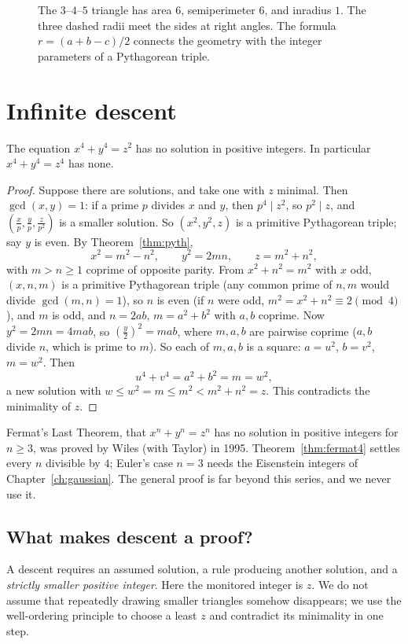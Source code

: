 \begin{figure}[ht]
\centering
{}
\caption{The $3$--$4$--$5$ triangle has area $6$, semiperimeter $6$, and inradius $1$. The three dashed radii meet the sides at right angles. The formula $r=(a+b-c)/2$ connects the geometry with the integer parameters of a Pythagorean triple.}
\label{fig:incircle}
\end{figure}

\section{Infinite descent}

\begin{theorem}[Fermat]\label{thm:fermat4}
The equation $x^4+y^4=z^2$ has no solution in positive integers. In particular $x^4+y^4=z^4$ has none.
\end{theorem}
\begin{proof}
Suppose there are solutions, and take one with $z$ minimal. Then $\gcd(x,y)=1$: if a prime $p$ divides $x$ and $y$, then $p^4\mid z^2$, so $p^2\mid z$, and $\left(\frac xp,\frac yp,\frac z{p^2}\right)$ is a smaller solution. So $(x^2,y^2,z)$ is a primitive Pythagorean triple; say $y$ is even. By Theorem~\ref{thm:pyth},
\[
x^2=m^2-n^2,\qquad y^2=2mn,\qquad z=m^2+n^2,
\]
with $m>n\ge1$ coprime of opposite parity. From $x^2+n^2=m^2$ with $x$ odd, $(x,n,m)$ is a primitive Pythagorean triple (any common prime of $n,m$ would divide $\gcd(m,n)=1$), so $n$ is even (if $n$ were odd, $m^2=x^2+n^2\equiv2\pmod4$), and $m$ is odd, and $n=2ab$, $m=a^2+b^2$ with $a,b$ coprime. Now $y^2=2mn=4mab$, so $\left(\frac y2\right)^2=mab$, where $m,a,b$ are pairwise coprime ($a,b$ divide $n$, which is prime to $m$). So each of $m,a,b$ is a square: $a=u^2$, $b=v^2$, $m=w^2$. Then
\[
u^4+v^4=a^2+b^2=m=w^2,
\]
a new solution with $w\le w^2=m\le m^2<m^2+n^2=z$. This contradicts the minimality of $z$.
\end{proof}

\begin{remark}
Fermat's Last Theorem, that $x^n+y^n=z^n$ has no solution in positive integers for $n\ge3$, was proved by Wiles (with Taylor) in 1995. Theorem~\ref{thm:fermat4} settles every $n$ divisible by $4$; Euler's case $n=3$ needs the Eisenstein integers of Chapter~\ref{ch:gaussian}. The general proof is far beyond this series, and we never use it.
\end{remark}

\subsection*{What makes descent a proof?}
A descent requires an assumed solution, a rule producing another solution, and a \emph{strictly smaller positive integer}. Here the monitored integer is $z$. We do not assume that repeatedly drawing smaller triangles somehow disappears; we use the well-ordering principle to choose a least $z$ and contradict its minimality in one step.

